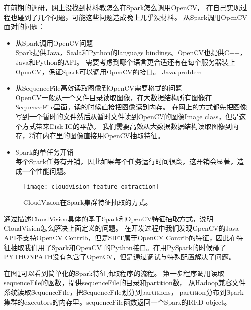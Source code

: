 在前期的调研，网上没找到材料教怎么在Spark怎么调用OpenCV，
在自己实现过程也碰到了几个问题，可能这些问题造成晚上几乎没材料。
从Spark调用OpenCV面对的问题：
\begin{itemize}
  \item 从Spark调用OpenCV问题 \\
        Spark提供Java，Scala和Python的language bindings。OpenCV也提供C++，Java和Python的API。
        需要考虑到哪个语言更合适还有在每个服务器装上OpenCV，保证Spark可以调用OpenCV的接口。
        Java problem
  \item 从SequenceFile高效读取图像到OpenCV需要格式的问题 \\
        OpenCV一般从一个文件目录读取图像，在大数据结构所有图像在SequenceFile里面，读的时候直接把图像读到内存。
        在网上的方式都先把图像写到一个暂时的文件然后从暂时文件读到OpenCV的图像Image class，但是这个方式带来Disk IO的平静。
        我们需要高效从大数据数据结构读取图像到内存，将在内存里的图像直接用OpenCV抽取特征。
  \item Spark的单任务开销 \\
        每个Spark任务有开销，因此如果每个任务运行时间很段，这开销会显著，造成一个性能问题。
\end{itemize}


\begin{figure}[h]
  \centering
    \texttt{[image: cloudvision-feature-extraction]}
  \caption{CloudVision在Spark集群特征抽取的方式。}
  \label{fig:cloudvision-feature-extraction}
\end{figure}
通过描述CloudVision具体的基于Spark和OpenCV特征抽取方式，说明CloudVision怎么解决上面定义的问题。
在开发过程中我们发现OpenCV的Java
API不支持OpenCV Contrib，但是SIFT属于OpenCV Contrib的特征，因此在特征抽取我们用了Spark和OpenCV
的Python接口。在用PySpark的时候碰了PYTHONPATH没有包含了OpenCV，但是通过调试与特殊配置解决了问题。

在图\ref{fig:cloudvision-feature-extraction}可以看到简单化的Spark特征抽取程序的流程。
第一步程序调用读取sequenceFile的函数，提供sequenceFile的目录和partition数，
从Hadoop兼容文件系统读取SequenceFile，把SequenceFile划分到partitions，
partition分布到Spark集群的executors的内存里。sequenceFile函数返回一个Spark的RRD object。

